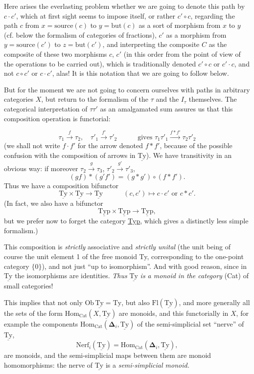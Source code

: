 \documentclass[11pt]{article}
\newcommand{\printedpage}[1]{\marginpar{\footnotesize p.~#1}}
\newcommand{\msp}[1]{\marginpar{\footnotesize [#1]}}
\newcommand{\Ty}{\mathrm{Ty}}
\newcommand{\uTy}{\underline{\mathrm{Ty}}}
\newcommand{\uTyp}{\underline{\mathrm{Typ}}}
\begin{document}
\printedpage{33}
Here arises the everlasting problem whether we are going to denote this path by $c{\cdot}c'$, which at first sight seems to impose itself, or rather $c' \circ c$, regarding the path $c$ from $x = \mathrm{source}(c)$ to $y = \mathrm{but}(c)$ as a sort of morphism from $x$ to $y$ (cf. below the formalism of categories of fractions), $c'$ as a morphism from $y = \mathrm{source}(c')$ to $z = \mathrm{but}(c')$, and interpreting the composite $C$ as the composite of these two morphisms $c$, $c'$ (in this order from the point of view of the operations to be carried out), which is traditionally denoted $c' \circ c$ or $c' \cdot c$, and not $c \circ c'$ or $c \cdot c'$, alas! It is this notation that we are going to follow below. %

But for the moment we are not going to concern ourselves with paths in arbitrary categories $X$, but return to the formalism of the $\tau$ and the $I_\tau$ themselves. The categorical interpretation of $\tau\tau'$ as an amalgamated sum assures us that this composition operation is functorial:

\msp{page 50}
\[
\tau_1 \xrightarrow{\ f\ } \tau_2, \quad \tau'_1 \xrightarrow{\ f'\ } \tau'_2 \qquad\quad \text{gives } \tau_1\tau'_1 \xrightarrow{f*f'} \tau_2\tau'_2
\]
(we shall not write $f \cdot f'$ for the arrow denoted $f * f'$, because of the possible confusion with the composition of arrows in $\uTy$). We have transitivity in an obvious way: if moreover $\tau_2 \xrightarrow{\ g\ } \tau_3$, $\tau'_2 \xrightarrow{\ g'\ } \tau'_3$,
\[
(gf) * (g'f') = (g * g') \circ (f * f').
\]
Thus we have a composition bifunctor
\[
\uTy \times \uTy \longrightarrow \uTy \qquad\quad (c,c') \longmapsto c \cdot c' \text{ or } c * c'.
\]
(In fact, we also have a bifunctor
\[
\uTyp \times \uTyp \longrightarrow \uTyp,
\]
but we prefer now to forget the category \underline{Typ}, which gives a distinctly less simple formalism.)

This composition is \textit{strictly} associative and \textit{strictly unital} (the unit being of course the unit element 1 of the free monoid Ty, corresponding to the one-point category $\{0\}$), and not just ``up to isomorphism''. And with good reason, since in $\uTy$ the isomorphisms are identities. \textit{Thus} $\uTy$ \textit{is a monoid in the category} (Cat) of small categories!

\msp{page 49$'$: second page so numbered}This implies that not only $\mathrm{Ob}\,\uTy = \Ty$, but also $\mathrm{Fl}(\uTy)$, and more generally all the sets of the form $\mathrm{Hom}_{\mathrm{Cat}}(X, \uTy)$ are monoids, and this functorially in $X$, for example the components $\mathrm{Hom}_{\mathrm{Cat}}(\boldsymbol{\Delta}_i, \uTy)$ of the semi-simplicial set ``nerve'' of $\uTy$,
\[
\mathrm{Nerf}_i(\uTy) = \mathrm{Hom}_{\mathrm{Cat}}(\boldsymbol{\Delta}_i, \uTy),
\]
are monoids, and the semi-simplicial maps between them are monoid homomorphisms: the nerve of $\uTy$ is a \textit{semi-simplicial monoid.}
\end{document}
